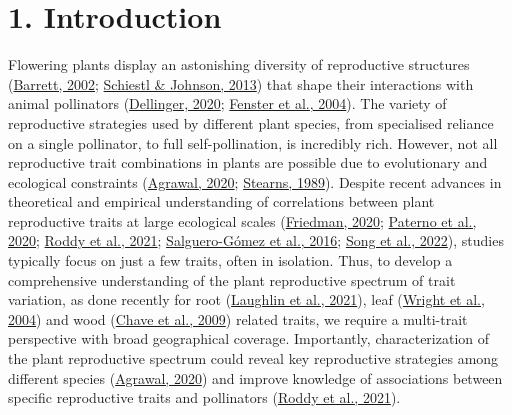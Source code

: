 \documentclass[
  12pt,
  a4paper,
]{article}
\begin{document}
\hypertarget{introduction}{%
\section{1. Introduction}\label{introduction}}

Flowering plants display an astonishing diversity of reproductive structures (\protect\hyperlink{ref-barrett2002}{Barrett, 2002}; \protect\hyperlink{ref-schiestl2013}{Schiestl \& Johnson, 2013}) that shape their interactions with animal pollinators (\protect\hyperlink{ref-dellinger2020}{Dellinger, 2020}; \protect\hyperlink{ref-fenster2004}{Fenster et al., 2004}). The variety of reproductive strategies used by different plant species, from specialised reliance on a single pollinator, to full self-pollination, is incredibly rich. However, not all reproductive trait combinations in plants are possible due to evolutionary and ecological constraints (\protect\hyperlink{ref-agrawal2020}{Agrawal, 2020}; \protect\hyperlink{ref-stearns1989}{Stearns, 1989}). Despite recent advances in theoretical and empirical understanding of correlations between plant reproductive traits at large ecological scales (\protect\hyperlink{ref-friedman2020}{Friedman, 2020}; \protect\hyperlink{ref-paterno2020}{Paterno et al., 2020}; \protect\hyperlink{ref-roddy2021}{Roddy et al., 2021}; \protect\hyperlink{ref-salguero2016}{Salguero-Gómez et al., 2016}; \protect\hyperlink{ref-song2022}{Song et al., 2022}), studies typically focus on just a few traits, often in isolation. Thus, to develop a comprehensive understanding of the plant reproductive spectrum of trait variation, as done recently for root (\protect\hyperlink{ref-laughlin2021}{Laughlin et al., 2021}), leaf (\protect\hyperlink{ref-wright2004}{Wright et al., 2004}) and wood (\protect\hyperlink{ref-chave2009}{Chave et al., 2009}) related traits, we require a multi-trait perspective with broad geographical coverage. Importantly, characterization of the plant reproductive spectrum could reveal key reproductive strategies among different species (\protect\hyperlink{ref-agrawal2020}{Agrawal, 2020}) and improve knowledge of associations between specific reproductive traits and pollinators (\protect\hyperlink{ref-roddy2021}{Roddy et al., 2021}).
\end{document}
